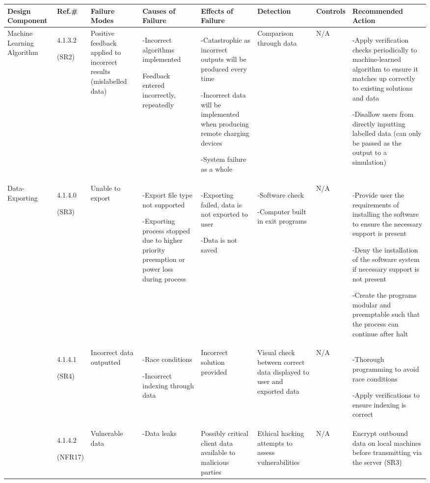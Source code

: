 \documentclass[12pt, titlepage]{article}
\begin{document}
\begin{center}
\begin{adjustwidth}{-3.5cm}{}
\begin{tabular}{|p{1.6cm}|p{1cm}|p{1.8cm}|p{2.4cm}|p{3cm}|p{1.7cm}|p{1.5cm}|p{4.5cm}|}
\hline
Design Component & Ref.\# & Failure Modes & Causes of Failure & Effects of Failure & Detection & Controls & Recommended Action\\
\hline
Machine Learning Algorithm & 4.1.3.2 \par (SR2) & Positive feedback applied to incorrect results (mislabelled data) & -Incorrect algorithms implemented \par Feedback entered incorrectly, repeatedly & -Catastrophic as incorrect outputs will be produced every time \par -Incorrect data will be implemented when producing remote charging devices \par -System failure as a whole & Comparison through data & N/A & -Apply verification checks periodically to machine-learned algorithm to ensure it matches up correctly to existing solutions and data \par -Disallow users from directly inputting labelled data (can only be passed as the output to a simulation)\\
\hline
Data-Exporting & 4.1.4.0 \par(SR3)& Unable to export & -Export file type not supported \par -Exporting process stopped due to higher priority preemption or power loss during process & -Exporting failed, data is not exported to user \par -Data is not saved & -Software check \par -Computer built in exit programs & N/A & -Provide user the requirements of installing the software to ensure the necessary support is present \par -Deny the installation of the software system if necessary support is not present \par -Create the programs modular and preemptable such that the process can continue after halt\\
& 4.1.4.1 \par (SR4)& Incorrect data outputted & -Race conditions \par -Incorrect indexing through data &  Incorrect solution provided &Visual check between correct data displayed to user and exported data & N/A & -Thorough programming to avoid race conditions \par -Apply verifications to ensure indexing is correct\\
&4.1.4.2 \par(NFR17)& Vulnerable data & -Data leaks & Possibly critical client data available to malicious parties & Ethical hacking attempts to assess vulnerabilities & N/A & Encrypt outbound data on local machines before transmitting via the server (SR3)\\
\hline 
\end{tabular}
\end{adjustwidth}
\end{center}
\end{document}
